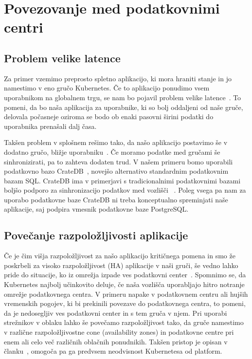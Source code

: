 \documentclass[a4paper, 12pt]{book}
\begin{document}
\chapter{Povezovanje med podatkovnimi centri}
\label{povezovanje-med-centri}
\section{Problem velike latence}
Za primer vzemimo preprosto spletno aplikacijo, ki mora hraniti stanje in jo namestimo v eno gručo Kubernetes.
Če to aplikacijo ponudimo vsem uporabnikom na globalnem trgu, se nam bo pojavil problem velike latence~\cite{minimizing-latency}.
To pomeni, da bo naša aplikacija za uporabnike, ki so bolj oddaljeni od naše gruče, delovala počasneje oziroma se bodo ob enaki pasovni širini podatki do uporabnika prenašali dalj časa.

Takšen problem v splošnem rešimo tako, da našo aplikacijo postavimo še v dodatno gručo, bližje uporabniku~\cite{geo-instability}.
Če moramo podatke med gručami še sinhronizirati, pa to zahteva dodaten trud.
V našem primeru bomo uporabili podatkovno bazo CrateDB~\cite{cratedb}, novejšo alternativo standardnim podatkovnim bazam SQL.
CrateDB ima v primerjavi s tradicionalnimi podatkovnimi bazami boljšo podporo za sinhronizacijo podatkov med vozlišči ~\cite{databases-comparison}.
Poleg vsega pa nam za uporabo podatkovne baze CrateDB ni treba konceptualno spreminjati naše aplikacije, saj podpira vmesnik podatkovne baze PostgreSQL.
\section{Povečanje razpoložljivosti aplikacije}
Če je čim višja razpoložljivost za našo aplikacijo kritičnega pomena in smo že poskrbeli za visoko razpoložljivost (HA) aplikacije v naši gruči, še vedno lahko pride do situacije, ko iz omrežja izpade ves podatkovni center~\cite{cloud-failures}.
Spomnimo se, da Kubernetes najbolj učinkovito deluje, če naša vozlišča uporabljajo hitro notranje omrežje podatkovnega centra.
V primeru napake v podatkovnem centru ali hujših vremenskih pogojev, ki bi prekinili povezave do podatkovnega centra, to pomeni, da je nedosegljiv ves podatkovni center in s tem gruča v njem.
Pri uporabi strežnikov v oblaku lahko še povečamo razpoložljivost tako, da gruče namestimo v različne razpoložljivostne cone (availability zones) in podatkovne centre pri enem ali celo več različnih oblačnih ponudnikih.
Takšen pristop je opisan v članku~\cite{tosca-fed}, omogoča pa ga predvsem neodvisnost Kubernetesa od platform.
\end{document}
